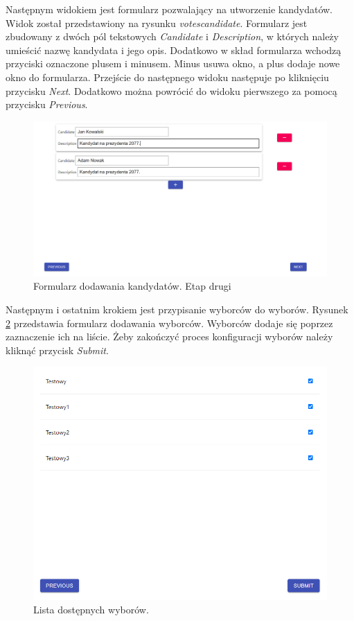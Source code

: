 \documentclass[a4paper,12pt]{book}
\begin{document}
Następnym widokiem jest formularz pozwalający na utworzenie kandydatów. Widok został przedstawiony na rysunku \textit{votescandidate}. Formularz jest zbudowany z dwóch pól tekstowych \textit{Candidate} i \textit{Description}, w których należy umieścić nazwę kandydata i jego opis. Dodatkowo w skład formularza wchodzą przyciski oznaczone plusem i minusem. Minus usuwa okno, a plus dodaje nowe okno do formularza. Przejście do następnego widoku następuje po kliknięciu przycisku \textit{Next}. Dodatkowo można powrócić do widoku pierwszego za pomocą przycisku \textit{Previous}.
\newpage

\begin{figure}[h]
	\centering
	\includegraphics[width=\textwidth]{images/votescandidate.png}
	\caption{Formularz dodawania kandydatów. Etap drugi}\label{votescandidate}
\end {figure}

Następnym i ostatnim krokiem jest przypisanie wyborców do wyborów. Rysunek \ref{choosevoters} przedstawia formularz dodawania wyborców. Wyborców dodaje się poprzez zaznaczenie ich na liście. Żeby zakończyć proces konfiguracji wyborów należy kliknąć przycisk \textit{Submit}.

\begin{figure}[H]
	\centering
	\includegraphics[width=\textwidth]{images/choosevoters.png}
	\caption{Lista dostępnych wyborów.}\label{choosevoters}
\end {figure}
\end{document}
